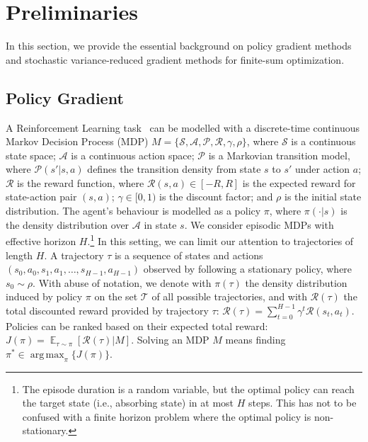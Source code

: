 \documentclass{article}
\makeatletter
\theoremstyle{remark}
\theoremstyle{definition}
\DeclareRobustCommand{\ie}{i.e.,\@\xspace}
\DeclareMathOperator*{\argmax}{arg\,max}
\DeclareMathOperator*{\EV}{\mathbb{E}}
\newcommand{\EVV}[2][\ppvect \in \ppspace]{\EV_{#1}\left[{#2}\right]}
\newcommand{\Aspace}{\mathcal{A}}
\newcommand{\Sspace}{\mathcal{S}}
\newcommand{\Tspace}{\mathcal{T}}
\newcommand{\Transition}{\mathcal{P}}
\newcommand{\Reward}{\mathcal{R}}
\makeatother
\begin{document}
\section{Preliminaries}\label{sec:pre}
In this section, we provide the essential background on policy gradient methods and stochastic variance-reduced gradient methods for finite-sum optimization.

\subsection{Policy Gradient}\label{subsec:PolicyGradient}
A Reinforcement Learning task~\citep{sutton1998reinforcement} can be modelled with a discrete-time continuous Markov Decision Process (MDP) $M = \{\Sspace,\Aspace,\Transition,\Reward,\gamma,\rho\}$, where $\Sspace$ is a continuous state space; $\Aspace$ is a continuous action space; $\Transition$ is a Markovian transition model, where $\Transition(s'|s,a)$ defines the transition density from state $s$ to $s'$ under action $a$; $\Reward$ is the reward function, where $\Reward(s,a) \in [-R,R]$ is the expected reward for state-action pair $(s,a)$;
$\gamma\in[0,1)$ is the discount factor; and $\rho$ is the initial state distribution.
The agent's behaviour is modelled as a policy $\pi$, where $\pi(\cdot|s)$ is the density distribution over $\Aspace$ in state $s$.
We consider episodic MDPs with effective horizon $H$.\footnote{The episode duration is a random variable, but the optimal policy can reach the target state (\ie absorbing state) in at most $H$ steps. This has not to be confused with a finite horizon problem where the optimal policy is non-stationary.} In this setting, we can limit our attention to trajectories of length $H$. A trajectory $\tau$ is a sequence of states and actions $(s_0,a_0,s_1,a_1,\dots,s_{H-1},a_{H-1})$ observed by following a stationary policy, where $s_0 \sim \rho$.
With abuse of notation, we denote with $\pi(\tau)$ the density distribution induced by policy $\pi$ on the set $\Tspace$ of all possible trajectories, and with $\Reward(\tau)$ the total discounted reward provided by trajectory $\tau$:
%
$\Reward(\tau) = \sum_{t=0}^{H-1}\gamma^t\Reward(s_t,a_t).$
%
Policies can be ranked based on their expected total reward: $J(\pi) = \EVV[\tau \sim \pi]{\Reward(\tau)|M}$.
Solving an MDP $M$ means finding $\pi^* \in \argmax_{\pi} \{J(\pi)\}$.
\end{document}
